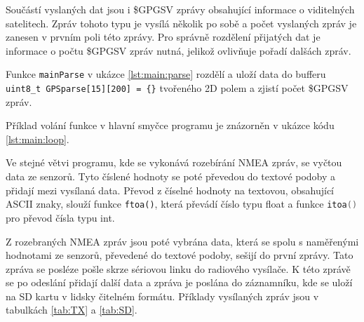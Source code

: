 \documentclass[twoside]{ctuthesis}
\theoremstyle{plain}
\theoremstyle{definition}
\theoremstyle{note}
\begin{document}
		Součástí vyslaných dat jsou i \$GPGSV zprávy obsahující informace o viditelných satelitech. Zpráv tohoto typu je vysílá několik po sobě a počet vyslaných zpráv je zanesen v prvním poli této zprávy. Pro správně rozdělení přijatých dat je informace o počtu \$GPGSV zpráv nutná, jelikož ovlivňuje pořadí dalšách zpráv.

		Funkce \lstinline[language=C] |mainParse| v ukázce \ref{lst:main:parse} rozdělí a uloží data do bufferu \lstinline |uint8_t GPSparse[15][200] = {}|   tvořeného 2D polem a zjistí počet \$GPGSV zpráv.

		



		Příklad volání funkce v hlavní smyčce programu je znázorněn v ukázce kódu \ref{lst:main:loop}.
		

		Ve stejné větvi programu, kde se vykonává rozebírání NMEA zpráv, se vyčtou data ze senzorů. Tyto číslené hodnoty se poté převedou do textové podoby a přidají mezi vysílaná data. Převod z číselné hodnoty na textovou, obsahující ASCII znaky, slouží funkce \lstinline |ftoa()|, která převádí číslo typu float a funkce \lstinline[language=C] |itoa()| pro převod čísla typu int. 

		Z rozebraných NMEA zpráv jsou poté vybrána data, která se spolu s naměřenými hodnotami ze senzorů, převedené do textové podoby, sešijí do první zprávy. Tato zpráva se posléze pošle skrze sériovou linku do radiového vysílače. K této zprávě se po odeslání přidají další data a zpráva je poslána do záznamníku, kde se uloží na SD kartu v lidsky čitelném formátu. Příklady vysílaných zpráv jsou v tabulkách \ref{tab:TX} a \ref{tab:SD}.
\end{document}
